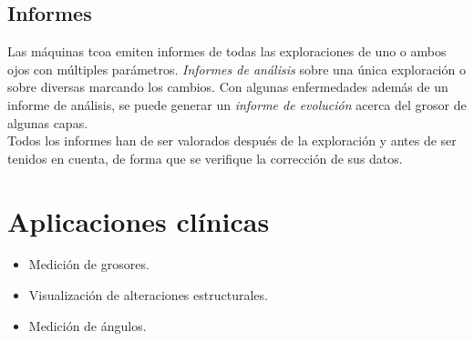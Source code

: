 \subsection{Informes}
Las máquinas \gls{tcoa} emiten informes de todas las exploraciones de
uno o ambos ojos con múltiples parámetros. \emph{Informes de análisis}
sobre una única exploración o sobre diversas marcando los cambios. Con
algunas enfermedades además de un informe de análisis, se puede
generar un \emph{informe de evolución} acerca del grosor de algunas
capas.\\
Todos los informes han de ser valorados después de la exploración
y antes de ser tenidos en cuenta, de forma que se verifique la
corrección de sus datos.

\section{Aplicaciones clínicas}
\begin{itemize}
\item Medición de grosores.
\item Visualización de alteraciones estructurales.
\item Medición de ángulos.
\end{itemize}